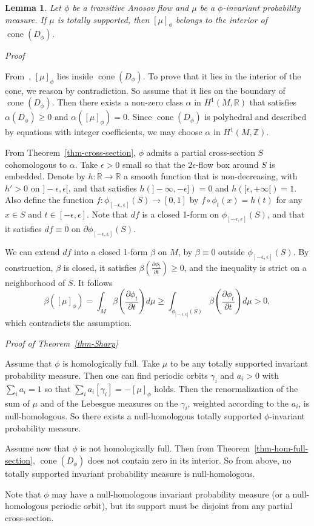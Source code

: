 \documentclass[colorinlistoftodos,12pt]{article}
\makeatletter
\newcommand{\RR}{\mathbb{R}}
\newcommand{\ZZ}{\mathbb{Z}}
\DeclareMathOperator{\cone}{cone}
\theoremstyle{colorplain}
\numberwithin{theorem}{section}
\newtheorem{lemma}[theorem]{Lemma}
\theoremstyle{colorremarkbis}
\theoremstyle{colorremark}
\theoremstyle{colordefinition}
\renewenvironment{proof}[1][Proof]{
    \setcounter{claim}{0}    
    \setcounter{claimproof}{0}    
    \par
    \pushQED{\qed}%
    \normalfont\topsep6\p@\@plus6\p@\relax
    \trivlist
    \item\relax
    {\itshape\color{RoyalPurple}#1\@addpunct{.}}\hspace\labelsep\ignorespaces
}{%
    \popQED\endtrivlist\@endpefalse
}
\newcounter{claimproof} %
\makeatother
\begin{document}
\begin{lemma}
	Let $\phi$ be a transitive Anosov flow and $\mu$ be a $\phi$-invariant probability measure. If $\mu$ is totally supported, then $[\mu]_\phi$ belongs to the interior of $\cone(D_\phi)$.
\end{lemma}

\begin{proof}
	From~\cite[Appendix]{marty2025partialI}, $[\mu]_\phi$ lies inside $\cone(D_\phi)$. To prove that it lies in the interior of the cone, we reason by contradiction. So assume that it lies on the boundary of $\cone(D_\phi)$. Then there exists a non-zero class $\alpha$ in $H^1(M,\RR)$ that satisfies $\alpha(D_\phi)\geq 0$ and $\alpha([\mu]_\phi)=0$. Since $\cone(D_\phi)$ is polyhedral and described by equations with integer coefficients, we may choose $\alpha$ in $H^1(M,\ZZ)$. 
	
	From Theorem~\ref{thm-cross-section}, $\phi$ admits a partial cross-section $S$ cohomologous to $\alpha$. Take $\epsilon>0$ small so that the $2\epsilon$-flow box around $S$ is embedded. Denote by $h\colon\RR\to\RR$ a smooth function that is non-decreasing, with $h'>0$ on $]-\epsilon,\epsilon[$, and that satisfies $h(]-\infty,-\epsilon])=0$ and $h([\epsilon,+\infty[)=1$. Also define the function $f\colon\phi_{[-\epsilon,\epsilon]}(S)\to[0,1]$ by $f\circ\phi_t(x)=h(t)$ for any $x\in S$ and $t\in[-\epsilon,\epsilon]$. Note that $df$ is a closed 1-form on $\phi_{[-\epsilon,\epsilon]}(S)$, and that it satisfies $df\equiv0$ on $\partial\phi_{[-\epsilon,\epsilon]}(S)$.

	We can extend $df$ into a closed 1-form $\beta$ on $M$, by $\beta\equiv0$ outside $\phi_{[-\epsilon,\epsilon]}(S)$. By construction, $\beta$ is closed, it satisfies $\beta(\frac{\partial\phi_t}{\partial t})\geq 0$, and the inequality is strict on a neighborhood of $S$. It follows 
	$$\beta([\mu]_\phi)=\int_M\beta\left(\frac{\partial\phi_t}{\partial t}\right)d\mu\geq\int_{\phi_{]-\epsilon,\epsilon[}(S)}\beta\left(\frac{\partial\phi_t}{\partial t}\right)d\mu >0,$$
	which contradicts the assumption.
\end{proof}


\begin{proof}[Proof of Theorem~\ref{thm-Sharp}]
	Assume that $\phi$ is homologically full. Take $\mu$ to be any totally supported invariant probability measure. Then one can find periodic orbits $\gamma_i$ and $a_i>0$ with $\sum_ia_i=1$ so that $\sum_ia_i[\gamma_i]=-[\mu]_\phi$ holds. Then the renormalization of the sum of $\mu$ and of the Lebesgue measures on the $\gamma_i$, weighted according to the $a_i$, is null-homologous. So there exists a null-homologous totally supported $\phi$-invariant probability measure.

	Assume now that $\phi$ is not homologically full. Then from Theorem~\ref{thm-hom-full-section}, $\cone(D_\phi)$ does not contain zero in its interior. So from above, no totally supported invariant probability measure is null-homologous.
\end{proof}

Note that $\phi$ may have a null-homologous invariant probability measure (or a null-homologous periodic orbit), but its support must be disjoint from any partial cross-section.




\end{document}
